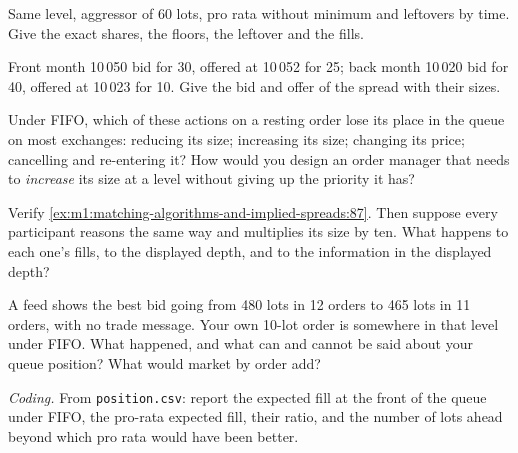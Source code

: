 \begin{exercise}[$\star$]\label{exo:m1:matching-algorithms-and-implied-spreads:2}
Same level, aggressor of 60 lots, pro rata without minimum and leftovers by
time. Give the exact shares, the floors, the leftover and the fills.
\end{exercise}

\begin{exercise}[$\star$]\label{exo:m1:matching-algorithms-and-implied-spreads:3}
Front month 10\,050 bid for 30, offered at 10\,052 for 25; back month 10\,020
bid for 40, offered at 10\,023 for 10. Give the  bid and offer of
the spread with their sizes.
\end{exercise}

\begin{exercise}[$\star\star$]\label{exo:m1:matching-algorithms-and-implied-spreads:4}
Under FIFO, which of these actions on a resting order lose its place in the
queue on most exchanges: reducing its size; increasing its size; changing
its price; cancelling and re-entering it? How would you design an order
manager that needs to \emph{increase} its size at a level without giving up
the priority it has?
\end{exercise}

\begin{exercise}[$\star\star$]\label{exo:m1:matching-algorithms-and-implied-spreads:5}
Verify \cref{ex:m1:matching-algorithms-and-implied-spreads:87}. Then suppose
every participant reasons the same way and multiplies its size by ten. What
happens to each one's fills, to the displayed depth, and to the information
in the displayed depth?
\end{exercise}

\begin{exercise}[$\star\star$]\label{exo:m1:matching-algorithms-and-implied-spreads:6}
A  feed shows the best bid going from 480 lots in 12 orders to
465 lots in 11 orders, with no trade message. Your own 10-lot order is
somewhere in that level under FIFO. What happened, and what can and cannot
be said about your queue position? What would market by order add?
\end{exercise}

\begin{exercise}[$\star\star\star$]\label{exo:m1:matching-algorithms-and-implied-spreads:7}
\emph{Coding.} From \texttt{position.csv}: report the expected fill at the
front of the queue under FIFO, the pro-rata expected fill, their ratio, and
the number of lots ahead beyond which pro rata would have been better.
\end{exercise}

